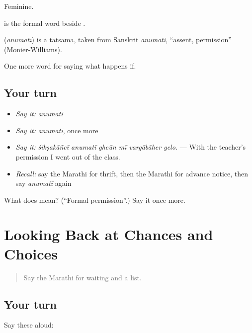 Feminine.

 is the formal word beside .

\begin{cousinweb}
\textbf{} (\emph{anumatī}) is a tatsama, taken from Sanskrit \emph{anumati}, \textquotedblleft{}assent, permission\textquotedblright{} (Monier-Williams).
\end{cousinweb}

\begin{grammarlens}[title={What you've built}]
One more word for saying what happens if.
\end{grammarlens}

\subsection*{Your turn}
\begin{itemize}
\raggedright
  \item \emph{Say it:} \emph{anumatī}
  \item \emph{Say it:} \emph{anumatī}, once more
  \item \emph{Say it:} \emph{śikṣakāñcī anumatī gheūn mī vargābāher gelo.} — With the teacher's permission I went out of the class.
  \item \emph{Recall:} say the Marathi for thrift, then the Marathi for advance notice, then say \emph{anumatī} again
\end{itemize}

\begin{tcolorbox}[breakable,colback=teal!4,colframe=teal!35!black,title={Before you move on}]
What does  mean? (\textquotedblleft{}Formal permission\textquotedblright{}.) Say it once more.
\end{tcolorbox}
\section[(dialogue)]{Looking Back at Chances and Choices}

\label{lesson:MR-R557-review-551-557}



\begin{quote}
Say the Marathi for waiting and a list.
\end{quote}

\subsection*{Your turn}
Say these aloud:

